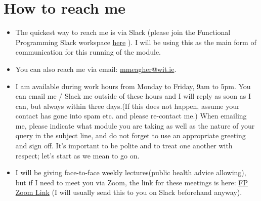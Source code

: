 \documentclass{article}
\begin{document}
\section{How to reach me}
\begin{itemize}
    \item The quickest way to reach me is via Slack (please join the Functional Programming  Slack workspace  
    \href{https://join.slack.com/t/slack-uvg2326/shared_invite/zt-11nr3172s-6T6eSGwcZoUvkRio95rxwA}{here} ).  
    I will be using  this  as the main form of communication for this running of the module. 
    \item You can also reach me via email: \href{mailto:mmeagher@wit.ie}{mmeagher@wit.ie}. 
    \item I am available during work hours from Monday to Friday, 9am to 5pm. You can email me / Slack me outside of these hours and I will reply as soon as I can, 
but always within three days.(If this does not happen, assume your contact has gone into spam etc. and please re-contact me.) When emailing me, please indicate what module you are taking as well as the nature of your query in the 
subject line, and do not forget to use an appropriate greeting and sign off. It’s important to be polite and to treat one another with 
respect; let’s start as we mean to go on.
    \item I will be giving face-to-face weekly lectures(public health advice allowing), but if I need to  meet you via Zoom, the link for these meetings is here: \href{https://wit-ie.zoom.us/j/94189213426}{FP Zoom Link}  (I will usually send this to you on Slack beforehand anyway).
\end{itemize}
\end{document}
